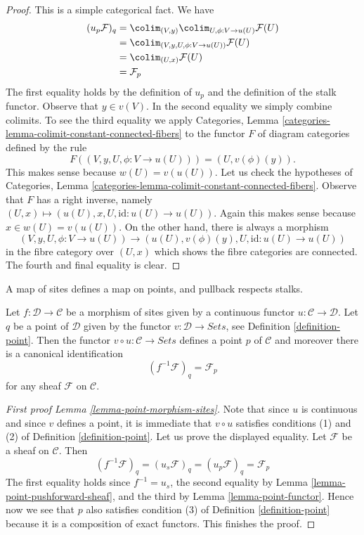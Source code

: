 \begin{proof}
This is a simple categorical fact. We have
\begin{align*}
(u_p\mathcal{F})_q
& =
\colim_{(V, y)} \colim_{U, \phi : V \to u(U)} \mathcal{F}(U) \\
& = \colim_{(V, y, U, \phi : V \to u(U))} \mathcal{F}(U) \\
& = \colim_{(U, x)} \mathcal{F}(U) \\
& = \mathcal{F}_p
\end{align*}
The first equality holds by the definition of $u_p$ and the
definition of the stalk functor. Observe that $y \in v(V)$.
In the second equality we simply combine colimits.
To see the third equality we apply
Categories, Lemma \ref{categories-lemma-colimit-constant-connected-fibers}
to the functor $F$ of diagram categories defined by the rule
$$
F((V, y, U, \phi : V \to u(U))) = (U, v(\phi)(y)).
$$
This makes sense because $w(U) = v(u(U))$. Let us check the hypotheses of
Categories, Lemma \ref{categories-lemma-colimit-constant-connected-fibers}.
Observe that $F$ has a right inverse, namely
$(U, x) \mapsto (u(U), x, U, \text{id} : u(U) \to u(U))$.
Again this makes sense because $x \in w(U) = v(u(U))$. On the other hand,
there is always a morphism
$$
(V, y, U, \phi : V \to u(U))
\longrightarrow
(u(U), v(\phi)(y), U, \text{id} : u(U) \to u(U))
$$
in the fibre category over $(U, x)$ which shows the fibre categories
are connected. The fourth and final equality is clear.
\end{proof}

\begin{lemma}
\label{lemma-point-morphism-sites}
\begin{slogan}
A map of sites defines a map on points, and pullback respects stalks.
\end{slogan}
Let $f : \mathcal{D} \to \mathcal{C}$ be a morphism of sites
given by a continuous functor $u : \mathcal{C} \to \mathcal{D}$.
Let $q$ be a point of $\mathcal{D}$ given by the functor
$v : \mathcal{D} \to \textit{Sets}$, see
Definition \ref{definition-point}.
Then the functor $v \circ u : \mathcal{C} \to \textit{Sets}$
defines a point $p$ of $\mathcal{C}$ and moreover there is
a canonical identification
$$
(f^{-1}\mathcal{F})_q = \mathcal{F}_p
$$
for any sheaf $\mathcal{F}$ on $\mathcal{C}$.
\end{lemma}

\begin{proof}[First proof Lemma \ref{lemma-point-morphism-sites}]
Note that since $u$ is continuous and since $v$ defines a point,
it is immediate that $v \circ u$ satisfies conditions (1) and (2) of
Definition \ref{definition-point}. Let us prove the displayed equality.
Let $\mathcal{F}$ be a sheaf on $\mathcal{C}$. Then
$$
(f^{-1}\mathcal{F})_q = (u_s\mathcal{F})_q =
(u_p \mathcal{F})_q = \mathcal{F}_p
$$
The first equality holds since $f^{-1} = u_s$, the second equality
by Lemma \ref{lemma-point-pushforward-sheaf}, and the third
by Lemma \ref{lemma-point-functor}.
Hence now we see that $p$ also satisfies condition (3) of
Definition \ref{definition-point}
because it is a composition of exact functors. This finishes the proof.
\end{proof}

